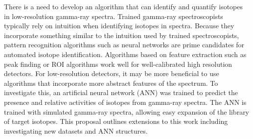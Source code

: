 There is a need to develop an algorithm that can identify and quantify isotopes in low-resolution gamma-ray spectra. Trained gamma-ray spectroscopists typically rely on intuition when identifying isotopes in spectra. Because they incorporate something similar to the intuition used by trained spectroscopists, pattern recognition algorithms such as neural networks are prime candidates for automated isotope identification. Algorithms based on feature extraction such as peak finding or ROI algorithms work well for well-calibrated high resolution detectors. For low-resolution detectors, it may be more beneficial to use algorithms that incorporate more abstract features of the spectrum. To investigate this, an artificial neural network (ANN) was trained to predict the presence and relative activities of isotopes from gamma-ray spectra. The ANN is trained with simulated gamma-ray spectra, allowing easy expansion of the library of target isotopes. This proposal outlines extensions to this work including investigating new datasets and ANN structures.